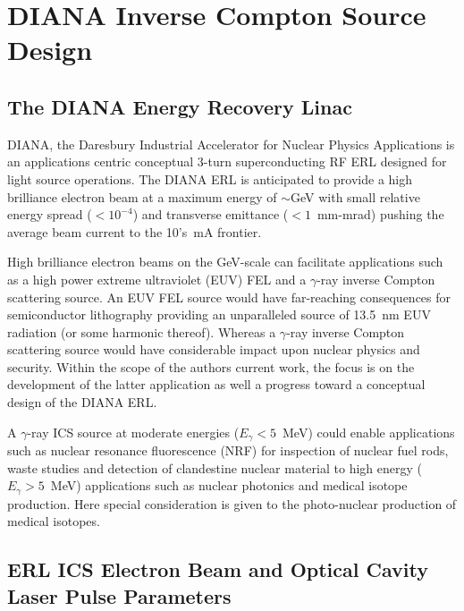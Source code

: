 \documentclass[../main.tex]{subfiles}
\begin{document}
\chapter{DIANA Inverse Compton Source Design}
\label{DIANA_Inverse_Compton_Source_Design} %

\section{The DIANA Energy Recovery Linac}

DIANA, the Daresbury Industrial Accelerator for Nuclear Physics Applications is an applications centric conceptual 3-turn superconducting RF ERL designed for light source operations. The DIANA ERL is anticipated to provide a high brilliance electron beam at a maximum energy of $\sim$\si{\giga\electronvolt} with small relative energy spread ($< 10^{-4}$) and transverse emittance ($< 1$~\si{\milli\meter}-\si{\milli\radian}) pushing the average beam current to the 10's~\si{\milli\ampere} frontier.

High brilliance electron beams on the \si{\giga\electronvolt}-scale can facilitate applications such as a high power extreme ultraviolet (EUV) FEL and a $\gamma$-ray inverse Compton scattering source. An EUV FEL source would have far-reaching consequences for semiconductor lithography providing an unparalleled source of 13.5~\si{\nano\meter} EUV radiation (or some harmonic thereof). Whereas a $\gamma$-ray inverse Compton scattering source would have considerable impact upon nuclear physics and security. Within the scope of the authors current work, the focus is on the development of the latter application as well a progress toward a conceptual design of the DIANA ERL.

A $\gamma$-ray ICS source at moderate energies ($E_{\gamma} < 5$~\si{\mega\electronvolt}) could enable applications such as nuclear resonance fluorescence (NRF) for inspection of nuclear fuel rods, waste studies and detection of clandestine nuclear material to high energy ($E_{\gamma} > 5$~\si{\mega\electronvolt}) applications such as nuclear photonics and medical isotope production. Here special consideration is given to the photo-nuclear production of medical isotopes. 

\section{ERL ICS Electron Beam and Optical Cavity Laser Pulse Parameters}
\end{document}
